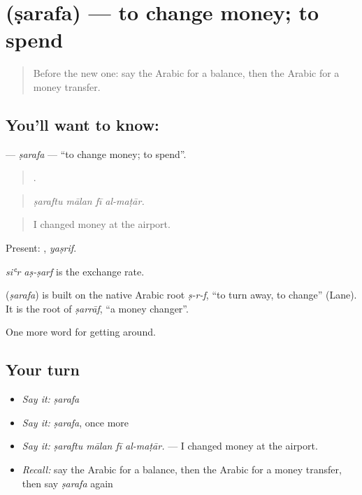 \section[\texorpdfstring{\ar{صرف} (ṣarafa)}{صرف (ṣarafa)}]{ (ṣarafa) — to change money; to spend}

\label{lesson:AR-C452-sarafa}



\begin{quote}
Before the new one: say the Arabic for a balance, then the Arabic for a money transfer.
\end{quote}

\subsection*{You'll want to know: }
\textbf{} — \emph{ṣarafa} — \textquotedblleft{}to change money; to spend\textquotedblright{}.

\begin{quote}
   .
\end{quote}

\begin{quote}
\emph{ṣaraftu mālan fī al-maṭār.}
\end{quote}

\begin{quote}
I changed money at the airport.
\end{quote}

Present: , \emph{yaṣrif}.

\emph{siʿr aṣ-ṣarf} is the exchange rate.

\begin{cousinweb}
\textbf{} (\emph{ṣarafa}) is built on the native Arabic root \emph{ṣ-r-f}, \textquotedblleft{}to turn away, to change\textquotedblright{} (Lane). It is the root of \emph{ṣarrāf}, \textquotedblleft{}a money changer\textquotedblright{}.
\end{cousinweb}

\begin{grammarlens}[title={What you've built}]
One more word for getting around.
\end{grammarlens}

\subsection*{Your turn}
\begin{itemize}
\raggedright
  \item \emph{Say it:} \emph{ṣarafa}
  \item \emph{Say it:} \emph{ṣarafa}, once more
  \item \emph{Say it:} \emph{ṣaraftu mālan fī al-maṭār.} — I changed money at the airport.
  \item \emph{Recall:} say the Arabic for a balance, then the Arabic for a money transfer, then say \emph{ṣarafa} again
\end{itemize}

